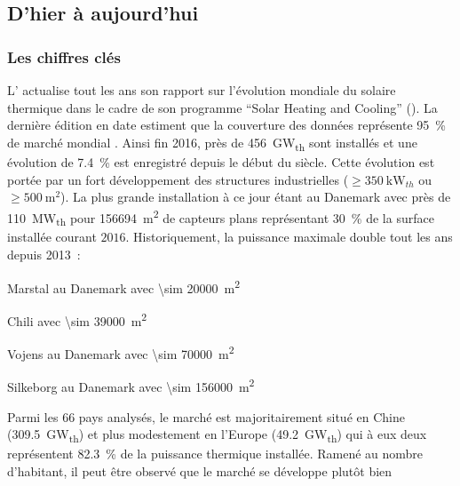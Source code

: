 \subsection{D’hier à aujourd’hui} %
\label{sub:d_hier_a_aujourd_hui}
\subsubsection{Les chiffres clés} %
\label{ssub:les_chiffres_cles}

L’ actualise tout les ans son rapport sur l’évolution mondiale du solaire thermique
dans le cadre de son programme \enquote{Solar Heating and Cooling} (). La dernière
édition en date estiment que la couverture des données représente \SI{95}{\percent} de
marché mondial \parencite{Weiss2017}. Ainsi fin 2016, près de \SI{456}{\giga\watt_{th}}
sont installés et une évolution de \SI{7.4}{\percent} est enregistré depuis le début du
siècle. Cette évolution est portée par un fort développement des structures industrielles
($\geq \SI{350}{\kilo\watt_{th}}$ ou $\geq \SI{500}{\metre\squared}$). La plus grande
installation à ce jour étant au Danemark avec près de \SI{110}{\mega\watt_{th}} pour
\SI{156694}{\metre\squared} de capteurs plans représentant \SI{30}{\percent} de la surface
installée courant $2016$. Historiquement, la puissance maximale double tout les ans depuis
2013~:
\begin{description}[align=left]
    \item [2013] Marstal au Danemark avec \SI{\sim 20000}{\metre\squared}
    \item [2014] Chili avec \SI{\sim 39000}{\metre\squared}
    \item [2015] Vojens au Danemark avec \SI{\sim 70000}{\metre\squared}
    \item [2016] Silkeborg  au Danemark avec \SI{\sim 156000}{\metre\squared}
\end{description}
Parmi les $66$ pays analysés, le marché est majoritairement situé en Chine
(\SI{309.5}{\giga\watt_{th}}) et plus modestement en l’Europe (\SI{49.2}{\giga\watt_{th}})
qui à eux deux représentent \SI{82.3}{\percent} de la puissance thermique installée.
Ramené au nombre d’habitant, il peut être observé que le marché se développe plutôt bien
